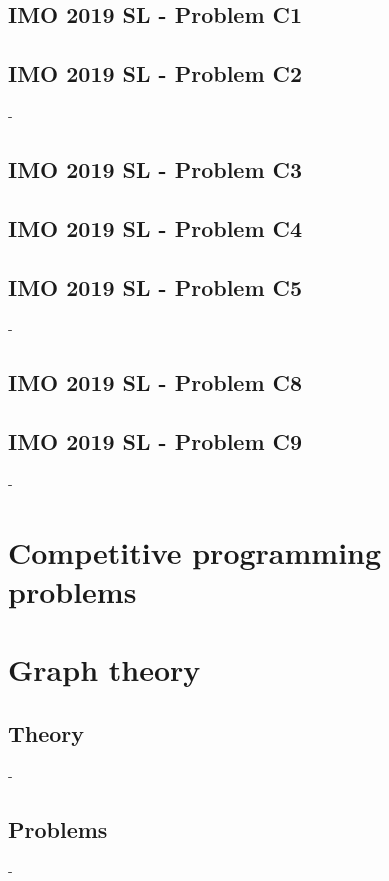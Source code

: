 \documentclass[12pt,openany,oneside]{book}
\theoremstyle{definition}
\numberwithin{definition}{section}
\numberwithin{theorem}{section}
\numberwithin{corollary}{section}
\numberwithin{proposition}{section}
\numberwithin{notation}{section}
\numberwithin{remark}{section}
\numberwithin{hypothesis}{section}
\numberwithin{example}{section}
\begin{document}
\section{IMO 2019 SL - Problem C1}

\section{IMO 2019 SL - Problem C2}-
\section{IMO 2019 SL - Problem C3}

\section{IMO 2019 SL - Problem C4}

\section{IMO 2019 SL - Problem C5}-
\section{IMO 2019 SL - Problem C8}

\section{IMO 2019 SL - Problem C9}-

\chapter{Competitive programming problems}

\chapter{Graph theory}
\section{Theory}-
\section{Problems}-



\end{document}
